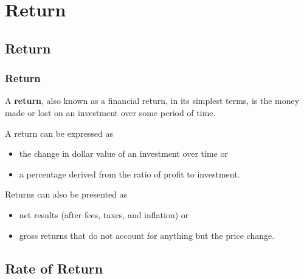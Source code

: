 \documentclass{beamer}
\begin{document}
\section{Return}








\subsection{Return}

\begin{frame}
\frametitle{\textbf{Return}}

\begin{definition}
\justifying
A \textbf{return}, also known as a financial return, in its simplest terms, is the money made or lost on an investment over some period of time.
\end{definition}

\vspace{0.8cm}
\justifying
A return can be expressed as
\begin{itemize}
	\justifying
	\item the change in dollar value of an investment over time or
	\item a percentage derived from the ratio of profit to investment.
\end{itemize}

\vspace{0.8cm}
\justifying
Returns can also be presented as
\begin{itemize}
	\justifying
	\item net results (after fees, taxes, and inflation) or
	\item gross returns that do not account for anything but the price change.
\end{itemize}


\end{frame}








\subsection{Rate of Return}
\end{document}
